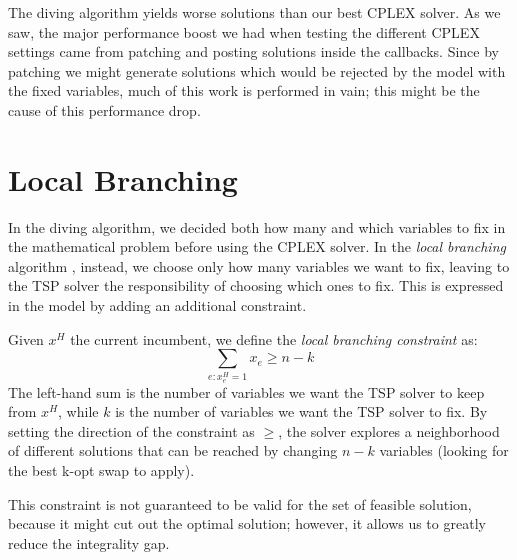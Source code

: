 The diving algorithm yields worse solutions than our best CPLEX solver. As we saw, the major performance boost we had when testing the different CPLEX settings came from patching and posting solutions inside the callbacks. Since by patching we might generate solutions which would be rejected by the model with the fixed variables, much of this work is performed in vain; this might be the cause of this performance drop.

\section{Local Branching}

In the diving algorithm, we decided both how many and which variables to fix in the mathematical problem before using the CPLEX solver. In the \textit{local branching} algorithm \cite{Fischetti2003}, instead, we choose only how many variables we want to fix, leaving to the TSP solver the responsibility of choosing which ones to fix. This is expressed in the model by adding an additional constraint.

Given $x^H$ the current incumbent, we define the \textit{local branching constraint} as:
$$\sum_{e:x^H_e=1}x_e\geq n-k$$
The left-hand sum is the number of variables we want the TSP solver to keep from $x^H$, while $k$ is the number of variables we want the TSP solver to fix. By setting the direction of the constraint as $\geq$, the solver explores a neighborhood of different solutions that can be reached by changing $n-k$ variables (looking for the best k-opt swap to apply).

This constraint is not guaranteed to be valid for the set of feasible solution, because it might cut out the optimal solution; however, it allows us to greatly reduce the integrality gap.

\FloatBarrier
